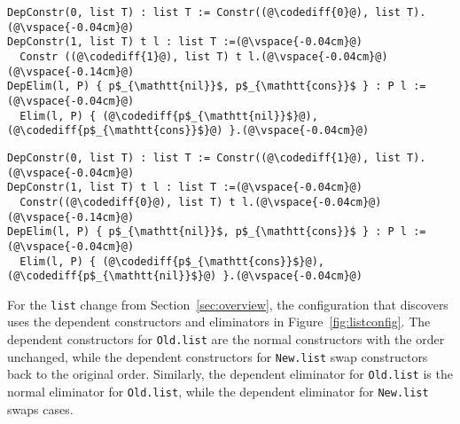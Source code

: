 \begin{figure*}
\begin{minipage}{0.48\textwidth}
\begin{lstlisting}
DepConstr(0, list T) : list T := Constr((@\codediff{0}@), list T).(@\vspace{-0.04cm}@)
DepConstr(1, list T) t l : list T :=(@\vspace{-0.04cm}@)
  Constr ((@\codediff{1}@), list T) t l.(@\vspace{-0.04cm}@)
(@\vspace{-0.14cm}@)
DepElim(l, P) { p$_{\mathtt{nil}}$, p$_{\mathtt{cons}}$ } : P l :=(@\vspace{-0.04cm}@)
  Elim(l, P) { (@\codediff{p$_{\mathtt{nil}}$}@), (@\codediff{p$_{\mathtt{cons}}$}@) }.(@\vspace{-0.04cm}@)
\end{lstlisting}
\end{minipage}
\hfill
\begin{minipage}{0.48\textwidth}
\begin{lstlisting}
DepConstr(0, list T) : list T := Constr((@\codediff{1}@), list T).(@\vspace{-0.04cm}@)
DepConstr(1, list T) t l : list T :=(@\vspace{-0.04cm}@)
  Constr((@\codediff{0}@), list T) t l.(@\vspace{-0.04cm}@)
(@\vspace{-0.14cm}@)
DepElim(l, P) { p$_{\mathtt{nil}}$, p$_{\mathtt{cons}}$ } : P l :=(@\vspace{-0.04cm}@)
  Elim(l, P) { (@\codediff{p$_{\mathtt{cons}}$}@), (@\codediff{p$_{\mathtt{nil}}$}@) }.(@\vspace{-0.04cm}@)
\end{lstlisting}
\end{minipage}
\vspace{-0.3cm}
\caption{The dependent constructors and eliminators for old (left) and new (right) \lstinline{list}.}
\label{fig:listconfig}
\end{figure*}

For the \lstinline{list} change from Section~\ref{sec:overview},
the configuration that \toolname discovers uses the dependent constructors
and eliminators in Figure~\ref{fig:listconfig}. The dependent constructors for \lstinline{Old.list}
are the normal constructors with the order unchanged,
while the dependent constructors for \lstinline{New.list} swap constructors
back to the original order.
Similarly, the dependent eliminator for \lstinline{Old.list} is the normal eliminator for \lstinline{Old.list},
while the dependent eliminator for \lstinline{New.list} swaps cases.

